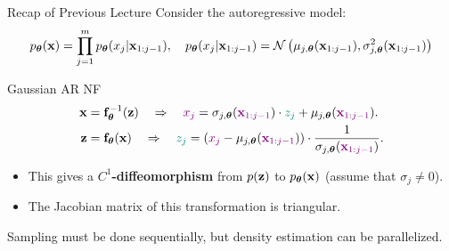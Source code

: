 \documentclass{beamer}
\begin{document}
\begin{frame}{Recap of Previous Lecture}
	Consider the autoregressive model:
	\vspace{-0.3cm}
	{\small
		\[
		p_{\boldsymbol{\theta}}(\mathbf{x}) = \prod_{j=1}^m p_{\boldsymbol{\theta}}(x_j | \mathbf{x}_{1:j-1}), \quad
		p_{\boldsymbol{\theta}}(x_j | \mathbf{x}_{1:j-1}) = \mathcal{N} \left(\mu_{j, \boldsymbol{\theta}}(\mathbf{x}_{1:j-1}), \sigma^2_{j, \boldsymbol{\theta}} (\mathbf{x}_{1:j-1})\right)
		\]
	}
	\vspace{-0.5cm}
	\begin{block}{Gaussian AR NF}
		\vspace{-0.5cm}
		\begin{align*}
			\mathbf{x} &= \mathbf{f}^{-1}_{\boldsymbol{\theta}}(\mathbf{z}) \quad \Rightarrow \quad {\color{violet} x_j} = \sigma_{j, \boldsymbol{\theta}} ({\color{violet} \mathbf{x}_{1:j-1}}) \cdot {\color{teal} z_j} + \mu_{j, \boldsymbol{\theta}}({\color{violet} \mathbf{x}_{1:j-1}}). \\
			\mathbf{z} &= \mathbf{f}_{\boldsymbol{\theta}}(\mathbf{x}) \quad \Rightarrow \quad {\color{teal} z_j} = \left({\color{violet}x_j} - \mu_{j, \boldsymbol{\theta}}({\color{violet}\mathbf{x}_{1:j-1}}) \right) \cdot \frac{1}{ \sigma_{j, \boldsymbol{\theta}} ({\color{violet}\mathbf{x}_{1:j-1}})}.
		\end{align*}
		\vspace{-0.5cm}
	\end{block}
	\begin{itemize}
		\item This gives a \textbf{$C^1$-diffeomorphism} from $p(\mathbf{z})$ to $p_{\boldsymbol{\theta}}(\mathbf{x})$ (assume that $\sigma_j \neq 0$).
		\item The Jacobian matrix of this transformation is triangular.
	\end{itemize}
	Sampling must be done sequentially, but density estimation can be parallelized.
\end{frame}
\end{document}
